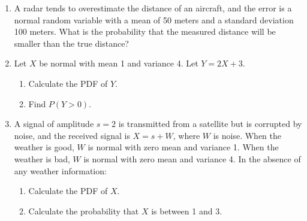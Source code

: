 \documentclass[paper=usletter, fontsize=12pt]{article}
\begin{document}

    \begin{enumerate}

        \item A radar tends to overestimate the distance of an aircraft, and
        the error is a normal random variable with a mean of 50 meters and a
        standard deviation 100 meters. What is the probability that the
        measured distance will be smaller than the true distance?
        \begin{cproof}
        \end{cproof}

        \item Let $X$ be normal with mean 1 and variance 4. Let $Y=2X+3$.
        \begin{enumerate}

            \item Calculate the PDF of $Y$.
            \begin{cproof}
            \end{cproof}

            \item Find $P(Y>0)$.
            \begin{cproof}
            \end{cproof}

        \end{enumerate}

        \item A signal of amplitude $s = 2$ is transmitted from a satellite but
        is corrupted by noise, and the received signal is $X = s+W$, where $W$
        is noise. When the weather is good, $W$ is normal with zero mean and
        variance 1. When the weather is bad, $W$ is normal with zero mean and
        variance 4. In the absence of any weather information:
        \begin{enumerate}

            \item Calculate the PDF of $X$.
            \begin{cproof}
            \end{cproof}

            \item Calculate the probability that $X$ is between 1 and 3.
            \begin{cproof}
            \end{cproof}

        \end{enumerate}


\end{enumerate}
\end{document}
